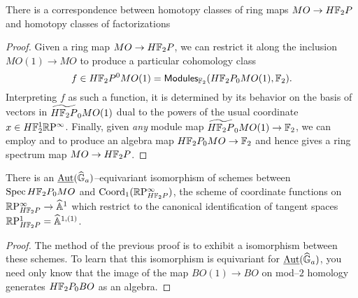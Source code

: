 \begin{corollary}
There is a correspondence between homotopy classes of ring maps $MO \to H\mathbb F_2P$ and homotopy classes of factorizations
\begin{center}
\end{center}
\end{corollary}
\begin{proof}
Given a ring map $MO \to H\mathbb F_2P$, we can restrict it along the inclusion $MO(1) \to MO$ to produce a particular cohomology class \[f \in H\mathbb F_2P^0 MO(1) = \mathsf{Modules}_{\mathbb F_2}(H\mathbb F_2P_0 MO(1), \mathbb F_2).\]  Interpreting $f$ as such a function, it is determined by its behavior on the basis of vectors in $\widetilde{H\mathbb F_2P}_0 MO(1)$ dual to the powers of the usual coordinate $x \in H\mathbb F_2^1 \mathbb R\mathrm P^\infty$.  Finally, given \emph{any} module map $\widetilde{H\mathbb F_2P}_0 MO(1) \to \mathbb F_2$, we can employ  and to produce an algebra map $H\mathbb F_2P_0 MO \to \mathbb F_2$ and hence  gives a ring spectrum map $MO \to H\mathbb F_2P$.
\end{proof}

\begin{corollary}
There is an $\operatorname{\underline{\smash{\operatorname{Aut}}}}(\widehat{\mathbb G}_a)$--equivariant isomorphism of schemes between $\operatorname{Spec} H\mathbb F_2P_0 MO$ and $\operatorname{Coord}_1(\mathbb R\mathrm P^\infty_{H\mathbb F_2P})$, the scheme of coordinate functions on $\mathbb R\mathrm P^\infty_{H\mathbb F_2P} \to \widehat{\mathbb{A}}^1$ which restrict to the canonical identification of tangent spaces $\mathbb R\mathrm P^1_{H\mathbb F_2P} = \widehat{\mathbb{A}}^{1,(1)}$.
\end{corollary}
\begin{proof}
The method of the previous proof is to exhibit a isomorphism between these schemes.  To learn that this isomorphism is equivariant for $\operatorname{\underline{\smash{\operatorname{Aut}}}}(\widehat{\mathbb G}_a)$, you need only know that the image of the map $BO(1) \to BO$ on mod--$2$ homology generates $H\mathbb F_2P_0 BO$ as an algebra.
\end{proof}

